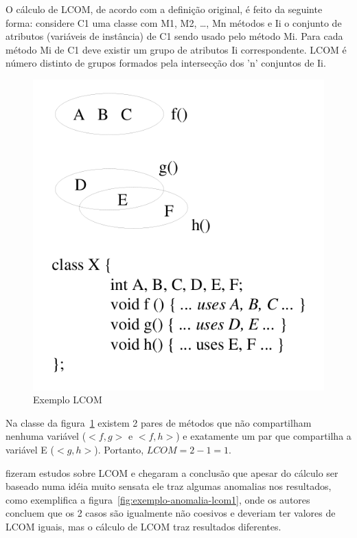 O cálculo de LCOM, de acordo com a definição original, é feito da seguinte
forma: considere C1 uma classe com M1, M2, \ldots, Mn métodos e Ii o conjunto
de atributos (variáveis de instância) de C1 sendo usado pelo método Mi. Para
cada método Mi de C1 deve existir um grupo de atributos Ii correspondente. LCOM
é número distinto de grupos formados pela intersecção dos 'n' conjuntos de Ii.

\begin{figure}[h]
\center
\includegraphics[scale=0.4]{imagens/exemplo-lcom1-hitz-e-montazeri}
\caption{Exemplo LCOM \cite{measuringCouplingAndCohesion}}
\label{fig:exemplo-lcom1}
\end{figure}

Na classe da figura~\ref{fig:exemplo-lcom1} existem 2 pares de métodos que não
compartilham nenhuma variável ($<f, g>$ e $<f, h>$) e exatamente um par que
compartilha a variável E ($<g, h>$). Portanto, $LCOM = 2 - 1 = 1$.

 fizeram estudos sobre
LCOM e chegaram a conclusão que apesar do cálculo ser baseado numa idéia
muito sensata ele traz algumas anomalias nos resultados, como exemplifica a
figura~\ref{fig:exemplo-anomalia-lcom1}, onde os autores concluem que os 2
casos são igualmente não coesivos e deveriam ter valores de LCOM iguais, mas
o cálculo de LCOM traz resultados diferentes.

